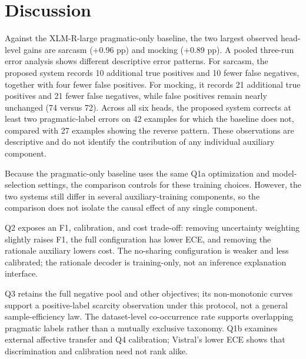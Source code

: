 \section{Discussion}

Against the XLM-R-large pragmatic-only baseline, the two largest observed head-level gains are sarcasm (+0.96 pp) and mocking (+0.89 pp). A pooled three-run error analysis shows different descriptive error patterns. For sarcasm, the proposed system records 10 additional true positives and 10 fewer false negatives, together with four fewer false positives. For mocking, it records 21 additional true positives and 21 fewer false negatives, while false positives remain nearly unchanged (74 versus 72). Across all six heads, the proposed system corrects at least two pragmatic-label errors on 42 examples for which the baseline does not, compared with 27 examples showing the reverse pattern. These observations are descriptive and do not identify the contribution of any individual auxiliary component.

Because the pragmatic-only baseline uses the same Q1a optimization and model-selection settings, the comparison controls for these training choices. However, the two systems still differ in several auxiliary-training components, so the comparison does not isolate the causal effect of any single component.

Q2 exposes an F1, calibration, and cost trade-off: removing uncertainty weighting slightly raises F1, the full configuration has lower ECE, and removing the rationale auxiliary lowers cost. The no-sharing configuration is weaker and less calibrated; the rationale decoder is training-only, not an inference explanation interface.

Q3 retains the full negative pool and other objectives; its non-monotonic curves support a positive-label scarcity observation under this protocol, not a general sample-efficiency law. The dataset-level co-occurrence rate supports overlapping pragmatic labels rather than a mutually exclusive taxonomy. Q1b examines external affective transfer and Q4 calibration; Vistral's lower ECE shows that discrimination and calibration need not rank alike.

